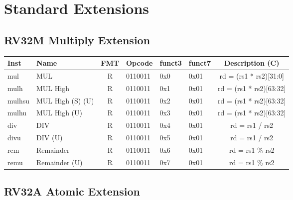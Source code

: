 \section*{Standard Extensions}

\subsection*{RV32M Multiply Extension}
\begin{center}
\begin{tabular}
{T | l | c | T | T | T | C } \hline
\rm Inst & Name              & FMT & \rm Opcode & \rm funct3 & \rm funct7 & \rm Description (C)     \\ \hline
mul      & MUL               & R   & 0110011    & 0x0    & 0x01   & rd = (rs1 * rs2)[31:0]  \\
mulh     & MUL High          & R   & 0110011    & 0x1    & 0x01   & rd = (rs1 * rs2)[63:32] \\
mulhsu   & MUL High (S) (U)  & R   & 0110011    & 0x2    & 0x01   & rd = (rs1 * rs2)[63:32] \\
mulhu    & MUL High (U)      & R   & 0110011    & 0x3    & 0x01   & rd = (rs1 * rs2)[63:32] \\
div      & DIV               & R   & 0110011    & 0x4    & 0x01   & rd = rs1 / rs2          \\
divu     & DIV (U)           & R   & 0110011    & 0x5    & 0x01   & rd = rs1 / rs2          \\
rem      & Remainder         & R   & 0110011    & 0x6    & 0x01   & rd = rs1 \% rs2         \\
remu     & Remainder (U)     & R   & 0110011    & 0x7    & 0x01   & rd = rs1 \% rs2         \\
\hline
\end{tabular}
\end{center}

\subsection*{RV32A Atomic Extension}


